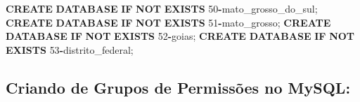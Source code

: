 \documentclass[
]{book}
\newenvironment{Shaded}{\begin{snugshade}}{\end{snugshade}}
\newcommand{\ControlFlowTok}[1]{\textcolor[rgb]{0.13,0.29,0.53}{\textbf{#1}}}
\newcommand{\DecValTok}[1]{\textcolor[rgb]{0.00,0.00,0.81}{#1}}
\newcommand{\KeywordTok}[1]{\textcolor[rgb]{0.13,0.29,0.53}{\textbf{#1}}}
\newcommand{\NormalTok}[1]{#1}
\newcommand{\OperatorTok}[1]{\textcolor[rgb]{0.81,0.36,0.00}{\textbf{#1}}}
\begin{document}
\begin{Shaded}
\begin{Highlighting}[]
\KeywordTok{CREATE} \KeywordTok{DATABASE} \ControlFlowTok{IF} \KeywordTok{NOT} \KeywordTok{EXISTS}\NormalTok{ \textasciigrave{}}\DecValTok{50}\OperatorTok{{-}}\NormalTok{mato\_grosso\_do\_sul\textasciigrave{};}
\KeywordTok{CREATE} \KeywordTok{DATABASE} \ControlFlowTok{IF} \KeywordTok{NOT} \KeywordTok{EXISTS}\NormalTok{ \textasciigrave{}}\DecValTok{51}\OperatorTok{{-}}\NormalTok{mato\_grosso\textasciigrave{};}
\KeywordTok{CREATE} \KeywordTok{DATABASE} \ControlFlowTok{IF} \KeywordTok{NOT} \KeywordTok{EXISTS}\NormalTok{ \textasciigrave{}}\DecValTok{52}\OperatorTok{{-}}\NormalTok{goias\textasciigrave{};}
\KeywordTok{CREATE} \KeywordTok{DATABASE} \ControlFlowTok{IF} \KeywordTok{NOT} \KeywordTok{EXISTS}\NormalTok{ \textasciigrave{}}\DecValTok{53}\OperatorTok{{-}}\NormalTok{distrito\_federal\textasciigrave{};}
\end{Highlighting}
\end{Shaded}

\subsection{Criando de Grupos de Permissões no MySQL:}\label{criando-de-grupos-de-permissuxf5es-no-mysql}
\end{document}
